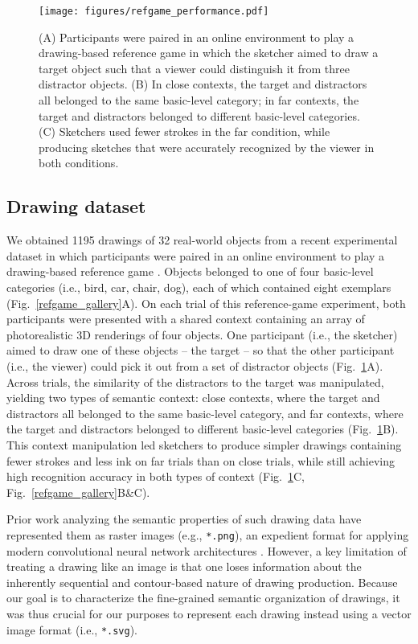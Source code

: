 \documentclass[10pt,letterpaper]{article}
\begin{document}
\begin{figure}[htbp]
\centering
\texttt{[image: figures/refgame\_performance.pdf]}
\caption{(A) Participants were paired in an online environment to play a drawing-based reference game in which the sketcher aimed to draw a target object such that a viewer could distinguish it from three distractor objects. (B) In close contexts, the target and distractors all belonged to the same basic-level category; in far contexts, the target and distractors belonged to different basic-level categories. (C) Sketchers used fewer strokes in the far condition, while producing sketches that were accurately recognized by the viewer in both conditions.}
\label{refgame_performance}
\end{figure}


\subsection{Drawing dataset}
We obtained 1195 drawings of 32 real-world objects from a recent experimental dataset in which participants were paired in an online environment to play a drawing-based reference game \cite{fan2018modeling}.
Objects belonged to one of four basic-level categories (i.e., bird, car, chair, dog), each of which contained eight exemplars (Fig.~\ref{refgame_gallery}A).
On each trial of this reference-game experiment, both participants were presented with a shared context containing an array of photorealistic 3D renderings of four objects.   
One participant (i.e., the sketcher) aimed to draw one of these objects -- the target -- so that the other participant (i.e., the viewer) could pick it out from a set of distractor objects (Fig.~\ref{refgame_performance}A). 
Across trials, the similarity of the distractors to the target was manipulated, yielding two types of semantic context: close contexts, where the target and distractors all belonged to the same basic-level category, and far contexts, where the target and distractors belonged to different basic-level categories (Fig.~\ref{refgame_performance}B). 
This context manipulation led sketchers to produce simpler drawings containing fewer strokes and less ink on far trials than on close trials, while still achieving high recognition accuracy in both types of context (Fig.~\ref{refgame_performance}C, Fig.~\ref{refgame_gallery}B\&C). 
 
Prior work analyzing the semantic properties of such drawing data have represented them as raster images (e.g., \texttt{*.png}), an expedient format for applying modern convolutional neural network architectures \cite{FanCommon2018,sangkloy2016sketchy,yu2017sketch}. 
However, a key limitation of treating a drawing like an image is that one loses information about the inherently sequential and contour-based nature of drawing production. 
Because our goal is to characterize the fine-grained semantic organization of drawings, it was thus crucial for our purposes to represent each drawing instead using a vector image format (i.e., \texttt{*.svg}). 
\end{document}
